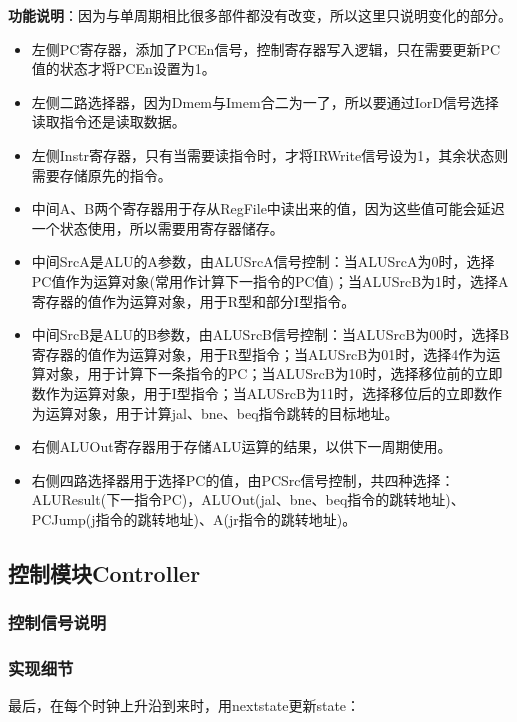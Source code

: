 \documentclass[12pt]{article} %
\begin{document}
\begin{sloppypar}
{\bf 功能说明}：因为与单周期相比很多部件都没有改变，所以这里只说明变化的部分。
\begin{itemize}
\item 左侧PC寄存器，添加了PCEn信号，控制寄存器写入逻辑，只在需要更新PC值的状态才将PCEn设置为1。
\item 左侧二路选择器，因为Dmem与Imem合二为一了，所以要通过IorD信号选择读取指令还是读取数据。
\item 左侧Instr寄存器，只有当需要读指令时，才将IRWrite信号设为1，其余状态则需要存储原先的指令。
\item 中间A、B两个寄存器用于存从RegFile中读出来的值，因为这些值可能会延迟一个状态使用，所以需要用寄存器储存。
\item 中间SrcA是ALU的A参数，由ALUSrcA信号控制：当ALUSrcA为0时，选择PC值作为运算对象(常用作计算下一指令的PC值)；当ALUSrcB为1时，选择A寄存器的值作为运算对象，用于R型和部分I型指令。
\item 中间SrcB是ALU的B参数，由ALUSrcB信号控制：当ALUSrcB为00时，选择B寄存器的值作为运算对象，用于R型指令；当ALUSrcB为01时，选择4作为运算对象，用于计算下一条指令的PC；当ALUSrcB为10时，选择移位前的立即数作为运算对象，用于I型指令；当ALUSrcB为11时，选择移位后的立即数作为运算对象，用于计算jal、bne、beq指令跳转的目标地址。
\item 右侧ALUOut寄存器用于存储ALU运算的结果，以供下一周期使用。
\item 右侧四路选择器用于选择PC的值，由PCSrc信号控制，共四种选择：ALUResult(下一指令PC)，ALUOut(jal、bne、beq指令的跳转地址)、PCJump(j指令的跳转地址)、A(jr指令的跳转地址)。
\end{itemize}

\subsection{控制模块Controller}

\subsubsection{控制信号说明}

\subsubsection{实现细节}


最后，在每个时钟上升沿到来时，用nextstate更新state：
\begin{lstlisting}[language=Verilog]  
\end{lstlisting}  


\end{sloppypar}
\end{document}
